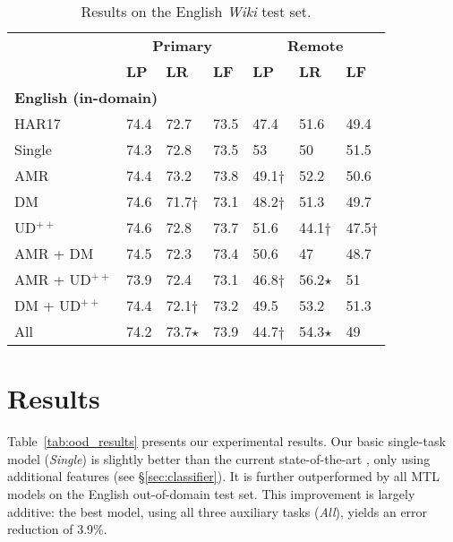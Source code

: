 \documentclass[11pt,a4paper]{article}
\begin{document}
\begin{table}[t]
\centering
\small
\setlength\tabcolsep{3pt}
\begin{tabular}{l|lll|lll}
& \multicolumn{3}{c|}{\footnotesize \bf Primary} & \multicolumn{3}{c}{\footnotesize \bf Remote} \\
& \footnotesize \textbf{LP} & \footnotesize \textbf{LR} & \footnotesize \textbf{LF}
& \footnotesize \textbf{LP} & \footnotesize \textbf{LR} & \footnotesize \textbf{LF} \\
\hline
\multicolumn{4}{l|}{\small \bf English (in-domain)} & \\
\footnotesize HAR17
& 74.4 & 72.7 & 73.5 & 47.4 & 51.6 & 49.4 \\
\footnotesize Single
& 74.3 & 72.8 & 73.5 & 53 & 50 & 51.5 \\
\cline{1-1}
\footnotesize AMR
& 74.4 & 73.2 & 73.8 & 49.1$\dagger$ & 52.2 & 50.6 \\
\footnotesize DM
& 74.6 & 71.7$\dagger$ & 73.1 & 48.2$\dagger$ & 51.3 & 49.7 \\
\footnotesize UD$^{++}$
& 74.6 & 72.8 & 73.7 & 51.6 & 44.1$\dagger$ & 47.5$\dagger$ \\
\footnotesize AMR + DM
& 74.5 & 72.3 & 73.4 & 50.6 & 47 & 48.7 \\
\footnotesize AMR + UD$^{++}$
& 73.9 & 72.4 & 73.1 & 46.8$\dagger$ & 56.2$\star$ & 51 \\
\footnotesize DM + UD$^{++}$
& 74.4 & 72.1$\dagger$ & 73.2 & 49.5 & 53.2 & 51.3 \\
\footnotesize All
& 74.2 & 73.7$\star$ & 73.9 & 44.7$\dagger$ & 54.3$\star$ & 49
\end{tabular}
\caption{
Results on the English \textit{Wiki} test set.
}
\label{tab:id_results}
\end{table}

\section{Results}\label{sec:results}

Table~\ref{tab:ood_results} presents our experimental results.
Our basic single-task model (\textit{Single})
is slightly better than the current state-of-the-art
\cite[shown as \textit{HAR17}]{hershcovich2017a},
only using additional features (see \S\ref{sec:classifier}).
It is further outperformed by all MTL models
on the English out-of-domain test set.
This improvement is largely additive: the best model, using all three auxiliary tasks (\textit{All}),
yields an error reduction of  3.9\%.
\end{document}
